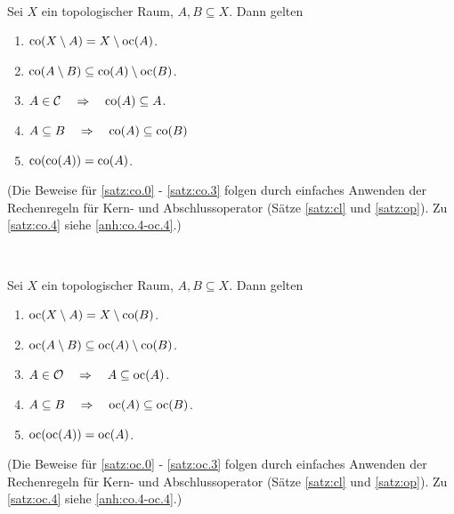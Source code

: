     \begin{satz}\label{satz:co} \ \vspace{8pt}

        \noindent
        Sei $X$ ein topologischer Raum, $A, B \subseteq X$. Dann gelten
        \begin{enumerate}
            \item \label{satz:co.0} $\text{co}(X \setminus A) = X \setminus \text{oc}(A)$.
            \item \label{satz:co.1} $\text{co}(A \setminus B) \subseteq \text{co}(A) \setminus \text{oc}(B)$.
            \item \label{satz:co.2} $A \in \mathcal{C} \quad \Rightarrow \quad \text{co}(A) \subseteq A$.
            \item \label{satz:co.3} $A \subseteq B \quad \Rightarrow \quad \text{co}(A) \subseteq \text{co}(B)$
            \item \label{satz:co.4} $\text{co}(\text{co}(A)) = \text{co}(A)$.		
        \end{enumerate}	
        
        (Die Beweise für \ref{satz:co.0} - \ref{satz:co.3} folgen durch einfaches Anwenden der Rechenregeln für Kern- und Abschlussoperator (Sätze \ref{satz:cl} und \ref{satz:op}). Zu \ref{satz:co.4} siehe \ref{anh:co.4-oc.4}.)
    \end{satz}
%
%
    \begin{satz} \label{satz:oc} \ \vspace{8pt}

        \noindent
        Sei $X$ ein topologischer Raum, $A, B \subseteq X$. Dann gelten
        \begin{enumerate}
            \item \label{satz:oc.0} $\text{oc}(X \setminus A) = X \setminus \text{co}(B)$.
            \item \label{satz:oc.1} $\text{oc}(A \setminus B) \subseteq \text{oc}(A) \setminus \text{co}(B)$.
            \item \label{satz:oc.2} $A \in \mathcal{O} \quad \Rightarrow \quad A \subseteq \text{oc}(A)$.
            \item \label{satz:oc.3} $A \subseteq B \quad \Rightarrow \quad \text{oc}(A) \subseteq \text{oc}(B)$.
            \item \label{satz:oc.4} $\text{oc}(\text{oc}(A)) = \text{oc}(A)$.
        \end{enumerate}	
        
        (Die Beweise für \ref{satz:oc.0} - \ref{satz:oc.3} folgen durch einfaches Anwenden der Rechenregeln für Kern- und Abschlussoperator (Sätze \ref{satz:cl} und \ref{satz:op}). Zu \ref{satz:oc.4} siehe \ref{anh:co.4-oc.4}.)
        
    \end{satz}
